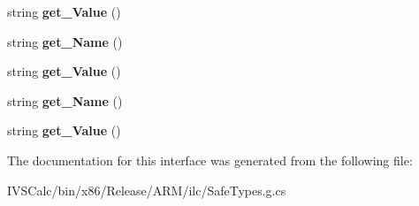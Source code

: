 \begin{DoxyCompactItemize}
string {\bfseries get\+\_\+\+Value} ()
\item 
\mbox{\label{interface_windows_1_1_foundation_1_1_i_www_form_url_decoder_entry_a385f9adec1cab0915c8eaa166e7b316d}} 
string {\bfseries get\+\_\+\+Name} ()
\item 
\mbox{\label{interface_windows_1_1_foundation_1_1_i_www_form_url_decoder_entry_a8bf99a4c054f99a89891281e55fdd396}} 
string {\bfseries get\+\_\+\+Value} ()
\item 
\mbox{\label{interface_windows_1_1_foundation_1_1_i_www_form_url_decoder_entry_a385f9adec1cab0915c8eaa166e7b316d}} 
string {\bfseries get\+\_\+\+Name} ()
\item 
\mbox{\label{interface_windows_1_1_foundation_1_1_i_www_form_url_decoder_entry_a8bf99a4c054f99a89891281e55fdd396}} 
string {\bfseries get\+\_\+\+Value} ()
\end{DoxyCompactItemize}


The documentation for this interface was generated from the following file\+:\begin{DoxyCompactItemize}
\item 
I\+V\+S\+Calc/bin/x86/\+Release/\+A\+R\+M/ilc/Safe\+Types.\+g.\+cs\end{DoxyCompactItemize}
